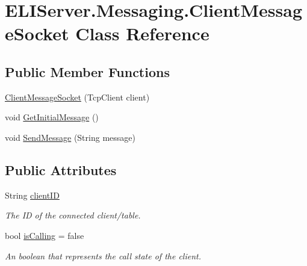 \hypertarget{class_e_l_i_server_1_1_messaging_1_1_client_message_socket}{}\section{E\+L\+I\+Server.\+Messaging.\+Client\+Message\+Socket Class Reference}
\label{class_e_l_i_server_1_1_messaging_1_1_client_message_socket}


 


\subsection*{Public Member Functions}
\begin{DoxyCompactItemize}
\item 
\hyperlink{class_e_l_i_server_1_1_messaging_1_1_client_message_socket_ae2c5fabcf44e180e767e22dbbe797174}{Client\+Message\+Socket} (Tcp\+Client client)
\item 
void \hyperlink{class_e_l_i_server_1_1_messaging_1_1_client_message_socket_ae337f033eec166081fc56f6a35a22c8f}{Get\+Initial\+Message} ()
\item 
void \hyperlink{class_e_l_i_server_1_1_messaging_1_1_client_message_socket_a0b1b4e6b86d3724706b8abf34a7a061c}{Send\+Message} (String message)
\end{DoxyCompactItemize}
\subsection*{Public Attributes}
\begin{DoxyCompactItemize}
\item 
String \hyperlink{class_e_l_i_server_1_1_messaging_1_1_client_message_socket_afdf35ffe78727bb8d1b1e53a9dd48760}{client\+ID}
\begin{DoxyCompactList}\small\item\em The ID of the connected client/table. \end{DoxyCompactList}\item 
bool \hyperlink{class_e_l_i_server_1_1_messaging_1_1_client_message_socket_af4b6f81ca94ef986655714c470d044e6}{is\+Calling} = false
\begin{DoxyCompactList}\small\item\em An boolean that represents the call state of the client. \end{DoxyCompactList}\end{DoxyCompactItemize}
